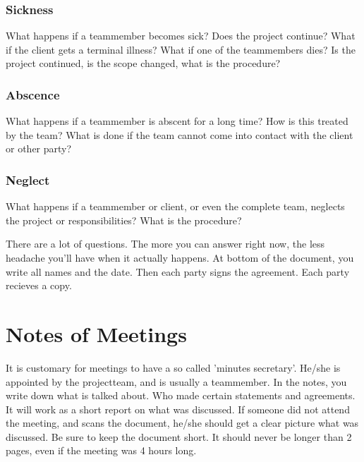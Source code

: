 \documentclass[10pt]{report}
\begin{document}
\subsubsection{Sickness}

What happens if a teammember becomes sick? Does the project continue? What if the client gets a terminal illness? What if one of the teammembers dies? Is the project continued, is the scope changed, what is the procedure?

\subsubsection{Abscence}

What happens if a teammember is abscent for a long time? How is this treated by the team? What is done if the team cannot come into contact with the client or other party?

\subsubsection{Neglect}

What happens if a teammember or client, or even the complete team, neglects the project or responsibilities? What is the procedure?

\bigskip

\noindent There are a lot of questions. The more you can answer right now, the less headache you'll have when it actually happens. At bottom of the document, you write all names and the date. Then each party signs the agreement. Each party recieves a copy.

\newpage

\section{Notes of Meetings}

It is customary for meetings to have a so called 'minutes secretary'. He/she is appointed by the projectteam, and is usually a teammember. In the notes, you write down what is talked about. Who made certain statements and agreements. It will work as a short report on what was discussed. If someone did not attend the meeting, and scans the document, he/she should get a clear picture what was discussed. Be sure to keep the document short. It should never be longer than 2 pages, even if the meeting was 4 hours long.

\newpage

% 
%
\end{document}
